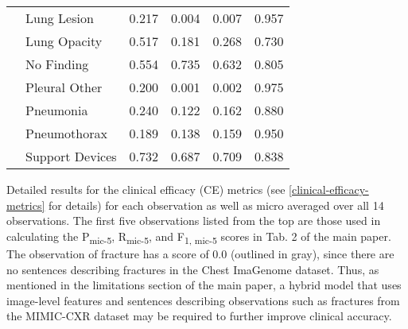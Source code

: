 \documentclass[10pt,twocolumn,letterpaper]{article}
\begin{document}
{{\begin{tabular}{c|l|cccc}
                            & Lung Lesion                                       & \multicolumn{1}{c|}{0.217} & \multicolumn{1}{c|}{0.004} & \multicolumn{1}{c|}{0.007}          & 0.957 \\
                            & Lung Opacity                                      & \multicolumn{1}{c|}{0.517} & \multicolumn{1}{c|}{0.181} & \multicolumn{1}{c|}{0.268}          & 0.730  \\
                            & No Finding                                        & \multicolumn{1}{c|}{0.554} & \multicolumn{1}{c|}{0.735} & \multicolumn{1}{c|}{0.632} & 0.805     \\
                            & Pleural Other                                     & \multicolumn{1}{c|}{0.200} & \multicolumn{1}{c|}{0.001} & \multicolumn{1}{c|}{0.002} & 0.975       \\ 
                            & Pneumonia                                         & \multicolumn{1}{c|}{0.240} & \multicolumn{1}{c|}{0.122} & \multicolumn{1}{c|}{0.162}          & 0.880        \\
                            & Pneumothorax                                      & \multicolumn{1}{c|}{0.189} & \multicolumn{1}{c|}{0.138} & \multicolumn{1}{c|}{0.159}          & 0.950   \\ 
                            & Support Devices                                   & \multicolumn{1}{c|}{0.732} & \multicolumn{1}{c|}{0.687} & \multicolumn{1}{c|}{0.709} & 0.838 \\ \hline
\end{tabular}
}
\caption{Detailed results for the clinical efficacy (CE) metrics (see \cref{clinical-efficacy-metrics} for details) for each observation as well as micro averaged over all 14 observations. The first five observations listed from the top are those used in calculating the P\textsubscript{mic-5}, R\textsubscript{mic-5}, and F\textsubscript{1, mic-5} scores in Tab. 2 of the main paper. The observation of fracture has a score of 0.0 (outlined in gray), since there are no sentences describing fractures in the Chest ImaGenome dataset. Thus, as mentioned in the limitations section of the main paper, a hybrid model that uses image-level features and sentences describing observations such as fractures from the MIMIC-CXR dataset may be required to further improve clinical accuracy.
}
\label{tab:detailed-ce-results}
}
\end{document}
